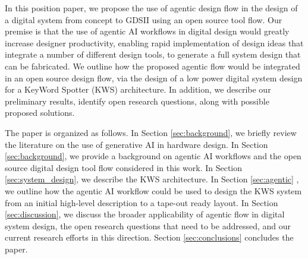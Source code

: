 In this position paper, we propose the use of agentic design flow in the design of a digital system from concept to GDSII using an open source tool flow. Our premise is that the use of agentic AI workflows in digital design would greatly increase designer productivity, enabling rapid implementation of design ideas that integrate a number of different design tools, to generate a full system design that can be fabricated. We outline how the proposed agentic flow would be integrated in an open source design flow, via the design of a low power digital system design for a KeyWord Spotter (KWS) architecture. In addition, we describe our preliminary results, identify open research questions, along with possible proposed solutions. 

The paper is organized as follows. In Section \ref{sec:background}, we briefly review the literature on the use of generative AI in hardware design. In Section \ref{sec:background}, we provide a background on agentic AI workflows and the open source digital design tool flow considered in this work. In Section \ref{sec:system_design}, we describe the KWS architecture. In Section \ref{sec:agentic} , we outline how the agentic AI workflow could be used to design the KWS system from an initial high-level description to a tape-out ready layout. In Section \ref{sec:discussion}, we discuss the broader applicability of agentic flow in digital system design, the open research questions that need to be addressed, and our current research efforts in this direction. Section \ref{sec:conclusions} concludes the paper.

